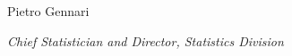 \documentclass[twoside,web]{faofactbook}
\begin{document}
\bigskip
\bigskip

\hspace*{\fill}
        Pietro Gennari
\hspace*{\fill}\newline

\hspace*{\fill}
        \textit{Chief Statistician and Director, Statistics Division}
\hspace*{\fill}





\tableofcontents











\end{document}
